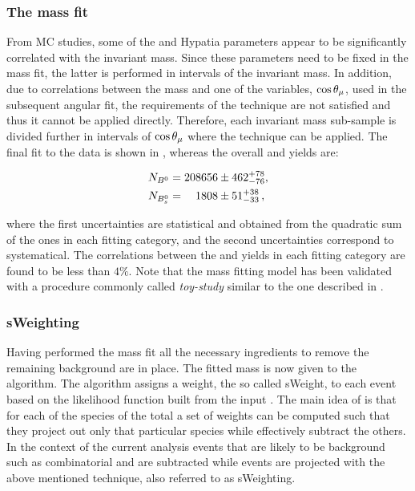 \subsubsection{The mass fit}
From MC studies, some of the \Bs and \Bd Hypatia parameters appear to be significantly correlated with the \mkpi invariant mass.
Since these parameters need to be fixed in the mass fit, the latter is performed in intervals of the
\mkpi invariant mass. In addition, due to correlations between the mass and one of the variables, $\cos\theta_{\mu}$, used in the
subsequent angular fit, the requirements of the \sPlot technique are not satisfied and thus it cannot be applied directly.
Therefore, each \mkpi invariant mass sub-sample is divided further in intervals of $\cos\theta_{\mu}$ where the \sPlot technique
can be applied.  The final fit to the data is shown in , whereas the overall \Bs and \Bd yields are:

\begin{align}
  \centering
  N_{\Bd} &= 208656  \pm  462 ^{+ 78	}_{- 76}, \\
  N_{\Bs} &= \phantom{00}1808  \pm   51 ^{+ 38	}_{- 33} \, ,
  \label{signal_yields}
\end{align}

\noindent where the first uncertainties are statistical and obtained from the quadratic sum of the ones in each fitting category,
and the second uncertainties correspond to systematical. The correlations between the \Bd and \Bs yields in each fitting category
are found to be less than $4\%$. Note that the mass fitting model has been validated with a procedure commonly called {\it toy-study}
similar to the one described in .

\subsubsection{sWeighting}
Having performed the mass fit all the necessary ingredients to remove the remaining background are in place.
The fitted mass \pdf is now given to the \sPlot algorithm. The algorithm assigns a weight, the so called sWeight, to each event
based on the likelihood function built from the input \pdf. The main idea of \sPlot is that for each of the species of the total
\pdf a set of weights can be computed such that they project out only that particular species while effectively subtract the others.
In the context of the current analysis events that are likely to be background such as combinatorial and \LbJpsipK are
subtracted while \BJpsiKst events are projected with the above mentioned technique, also referred to as sWeighting.

